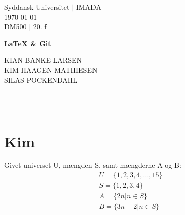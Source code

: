 \documentclass[12pt, a4paper]{article}
\begin{document}
\begin{titlepage} 
\begin{centering}
\large Syddansk Universitet $|$ IMADA \\
\today \\
DM500 | 20. f\\

\vspace{4CM}

\huge{\bf \LaTeX{} \& Git } \\

\vspace{\fill}

\fontsize{14}{19.2} {
    \selectfont
    KIAN BANKE LARSEN \vspace{5pt} \\
    KIM HAAGEN MATHIESEN \vspace{5pt} \\
    SILAS POCKENDAHL \vspace{5pt} \\
    \quad
} \\

\vspace{\fill}

\\\vspace{.55cm}
\end{centering}

\end{titlepage}

\section{Kim}
Givet universet U, mængden S, samt mængderne A og B: \\
    \begin{gather*}
    U = \{1, 2, 3, 4, ..., 15\} \\ 
        S = \{1, 2, 3, 4\}\\
        A = \{ 2n | n \in S \}\\
        B = \{ 3n+2 | n \in S \}
    \end{gather*}
         
\end{document}
